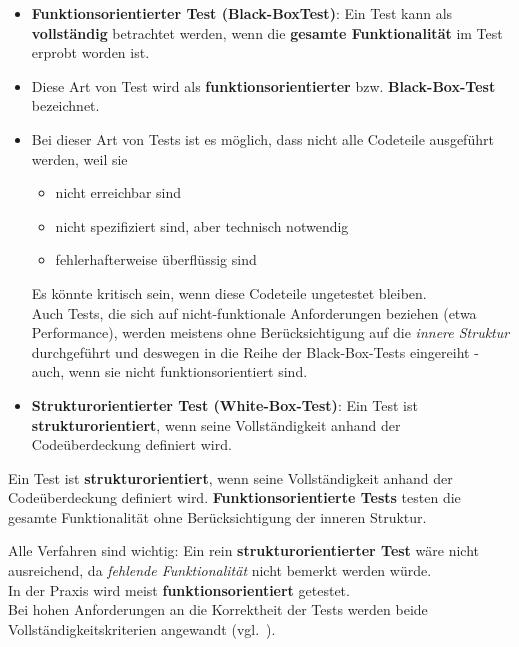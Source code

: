 \begin{itemize}
    \item \textbf{Funktionsorientierter Test (Black-BoxTest)}: Ein Test kann als \textbf{vollständig} betrachtet werden, wenn die \textbf{gesamte Funktionalität} im Test erprobt worden ist.
    \item[] Diese Art von Test wird als \textbf{funktionsorientierter} bzw. \textbf{Black-Box-Test} bezeichnet.
    \item[] Bei dieser Art von Tests ist es möglich, dass nicht alle Codeteile ausgeführt werden, weil sie
    \begin{itemize}
        \item nicht erreichbar sind
        \item nicht spezifiziert sind, aber technisch notwendig
        \item fehlerhafterweise überflüssig sind
    \end{itemize}
    \noindent
    Es könnte kritisch sein, wenn diese Codeteile ungetestet bleiben.\\
    Auch Tests, die sich auf nicht-funktionale Anforderungen beziehen (etwa Performance), werden meistens ohne Berücksichtigung auf die \textit{innere Struktur} durchgeführt und deswegen in die Reihe der Black-Box-Tests eingereiht - auch, wenn sie nicht funktionsorientiert sind.
    \item \textbf{Strukturorientierter Test (White-Box-Test)}: Ein Test ist \textbf{strukturorientiert}, wenn seine Vollständigkeit anhand der Codeüberdeckung definiert wird.
\end{itemize}

\vspace{2mm}
\begin{tcolorbox}[title=Strukturorientierte und funktionsorientierte Tests]
    Ein Test ist \textbf{strukturorientiert}, wenn seine Vollständigkeit anhand der Codeüberdeckung definiert wird.  \textbf{Funktionsorientierte Tests} testen die gesamte Funktionalität ohne Berücksichtigung der inneren Struktur.
\end{tcolorbox}
\vspace{2mm}

\noindent
Alle Verfahren sind wichtig: Ein rein \textbf{strukturorientierter Test} wäre nicht ausreichend, da \textit{fehlende Funktionalität} nicht bemerkt werden würde.\\
In der Praxis wird meist \textbf{funktionsorientiert} getestet.\\

\noindent
Bei hohen Anforderungen an die Korrektheit der Tests werden beide Vollständigkeitskriterien angewandt (vgl.~\cite[42]{Wed09c}).
